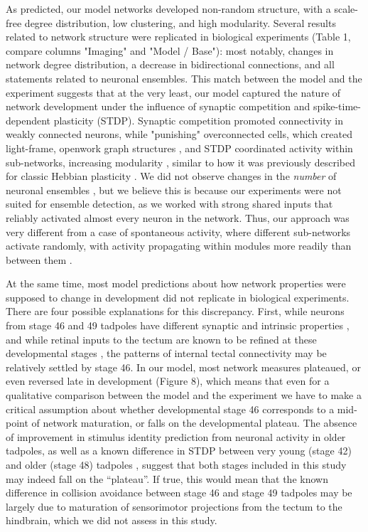 \documentclass{article}
\begin{document}
As predicted, our model networks developed non-random structure, with a scale-free degree distribution, low clustering, and high modularity. Several results related to network structure were replicated in biological experiments (Table 1, compare columns "Imaging" and "Model / Base"): most notably, changes in network degree distribution, a decrease in bidirectional connections, and all statements related to neuronal ensembles. This match between the model and the experiment suggests that at the very least, our model captured the nature of network development under the influence of synaptic competition and spike-time-dependent plasticity (STDP). Synaptic competition promoted connectivity in weakly connected neurons, while "punishing" overconnected cells, which created light-frame, openwork graph structures \citep{fiete2010chains}, and STDP coordinated activity within sub-networks, increasing modularity \citep{stam2010modular, litwin2014assemblies}, similar to how it was previously described for classic Hebbian plasticity \citep{damicelli2018topomod, triplett2018emergence}. We did not observe changes in the \textit{number} of neuronal ensembles \citep{avitan2017spontaneous, pietri2017emergence}, but we believe this is because our experiments were not suited for ensemble detection, as we worked with strong shared inputs that reliably activated almost every neuron in the network. Thus, our approach was very different from a case of spontaneous activity, where different sub-networks activate randomly, with activity propagating within modules more readily than between them \citep{avitan2017spontaneous}.

At the same time, most model predictions about how network properties were supposed to change in development did not replicate in biological experiments. There are four possible explanations for this discrepancy. First, while neurons from stage 46 and 49 tadpoles have different synaptic and intrinsic properties \citep{ciarleglio2015}, and while retinal inputs to the tectum are known to be refined at these developmental stages \citep{tao2005refinement, munz2014hebbian}, the patterns of internal tectal connectivity may be relatively settled by stage 46. In our model, most network measures plateaued, or even reversed late in development (Figure 8), which means that even for a qualitative comparison between the model and the experiment we have to make a critical assumption about whether developmental stage 46 corresponds to a mid-point of network maturation, or falls on the developmental plateau. The absence of improvement in stimulus identity prediction from neuronal activity in older tadpoles, as well as a known difference in STDP between very young (stage 42) and older (stage 48) tadpoles \citep{richards2010stdp, tsui2010developmental}, suggest that both stages included in this study may indeed fall on the “plateau”. If true, this would mean that the known difference in collision avoidance between stage 46 and stage 49 tadpoles \citep{dong2009} may be largely due to maturation of sensorimotor projections from the tectum to the hindbrain, which we did not assess in this study.
\end{document}
